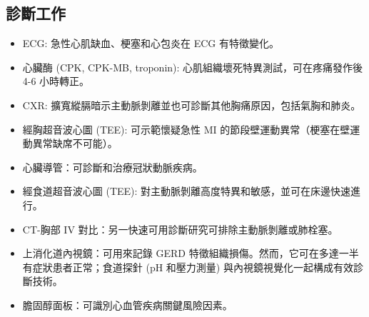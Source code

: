 \documentclass{article}
\begin{document}
\subsection{診斷工作}
\begin{itemize}
\item ECG: 急性心肌缺血、梗塞和心包炎在 ECG 有特徵變化。
\item 心臟酶 (CPK, CPK-MB, troponin): 心肌組織壞死特異測試，可在疼痛發作後 4-6 小時轉正。
\item CXR: 擴寬縱膈暗示主動脈剝離並也可診斷其他胸痛原因，包括氣胸和肺炎。
\item 經胸超音波心圖 (TEE): 可示範懷疑急性 MI 的節段壁運動異常（梗塞在壁運動異常缺席不可能）。
\item 心臟導管：可診斷和治療冠狀動脈疾病。
\item 經食道超音波心圖 (TEE): 對主動脈剝離高度特異和敏感，並可在床邊快速進行。
\item CT-胸部 IV 對比：另一快速可用診斷研究可排除主動脈剝離或肺栓塞。
\item 上消化道內視鏡：可用來記錄 GERD 特徵組織損傷。然而，它可在多達一半有症狀患者正常；食道探針 (pH 和壓力測量) 與內視鏡視覺化一起構成有效診斷技術。
\item 膽固醇面板：可識別心血管疾病關鍵風險因素。
\end{itemize}
\end{document}
